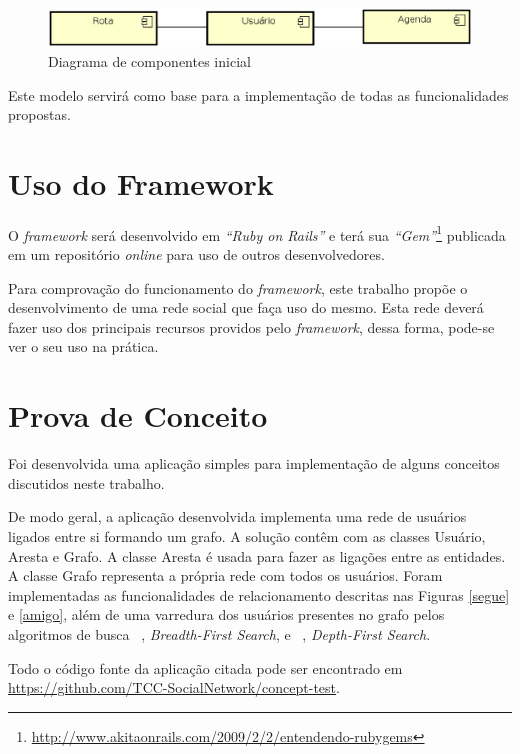 \begin{figure}[!h]
	\centering
	\includegraphics[scale=0.55]{figuras/capitulo5/diagrama_componentes.eps}
	\caption{Diagrama de componentes inicial}
	\label{diagrama de componentes}
\end{figure}

Este modelo servirá como base para a implementação de todas as funcionalidades propostas.

\section{Uso do Framework}

O \textit{framework} será desenvolvido em \textit{``Ruby on Rails''} e terá sua \textit{``Gem''}\footnote{\url{http://www.akitaonrails.com/2009/2/2/entendendo-rubygems}} publicada em um repositório \textit{online} para uso de outros desenvolvedores.

Para comprovação do funcionamento do \textit{framework}, este trabalho propõe o desenvolvimento de uma rede social que faça uso do mesmo. Esta rede deverá fazer uso dos principais recursos providos pelo \textit{framework}, dessa forma, pode-se ver o seu uso na prática.

\section{Prova de Conceito}

Foi desenvolvida uma aplicação simples para implementação de alguns conceitos discutidos neste trabalho.

De modo geral, a aplicação desenvolvida implementa uma rede de usuários ligados entre si formando um grafo. A solução contêm com as classes Usuário, Aresta e Grafo. A classe Aresta é usada para fazer as ligações entre as entidades. A classe Grafo representa a própria rede com todos os usuários. Foram implementadas as funcionalidades de relacionamento descritas nas Figuras \ref{segue} e \ref{amigo}, além de uma varredura dos usuários presentes no grafo pelos algoritmos de busca ~, \textit{Breadth-First Search}, e ~, \textit{Depth-First Search}.

Todo o código fonte da aplicação citada pode ser encontrado em \url{https://github.com/TCC-SocialNetwork/concept-test}.

